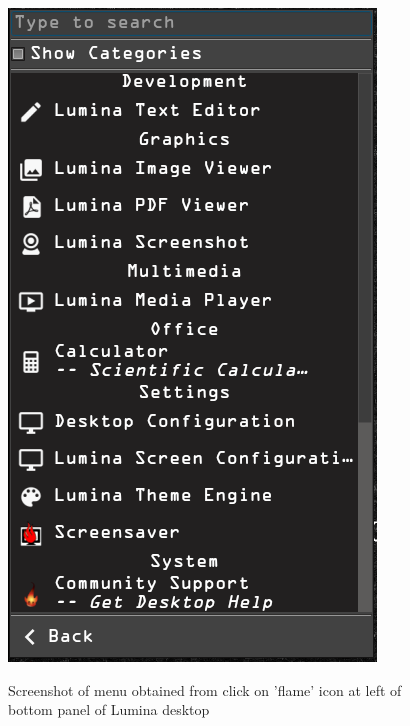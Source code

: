 \begin{figure}[p]
{    \includegraphics[scale=0.50]{menu2.png}
  }
  \caption{Screenshot of menu obtained from click on 'flame' icon at left of bottom panel of Lumina desktop}
\vfill
  \label{fig:menu12}
\end{figure}

%

